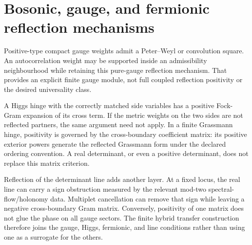 \documentclass[11pt,a4paper,oneside]{book}
\theoremstyle{plain}
\theoremstyle{definition}
\theoremstyle{remark}
\begin{document}
\section{Bosonic, gauge, and fermionic reflection mechanisms}
Positive-type compact gauge weights admit a Peter--Weyl or convolution square. An autocorrelation weight may be supported inside an admissibility neighbourhood while retaining this pure-gauge reflection mechanism. That provides an explicit finite gauge module, not full coupled reflection positivity or the desired universality class. \cite{R6,R19}

A Higgs hinge with the correctly matched side variables has a positive Fock-Gram expansion of its cross term. If the metric weights on the two sides are not reflected partners, the same argument need not apply. In a finite Grassmann hinge, positivity is governed by the cross-boundary coefficient matrix: its positive exterior powers generate the reflected Grassmann form under the declared ordering convention. A real determinant, or even a positive determinant, does not replace this matrix criterion. \cite{R19}

Reflection of the determinant line adds another layer. At a fixed locus, the real line can carry a sign obstruction measured by the relevant mod-two spectral-flow/holonomy data. Multiplet cancellation can remove that sign while leaving a negative cross-boundary Gram matrix. Conversely, positivity of one matrix does not glue the phase on all gauge sectors. The finite hybrid transfer construction therefore joins the gauge, Higgs, fermionic, and line conditions rather than using one as a surrogate for the others. \cite{R10,R18,R19}
\end{document}
